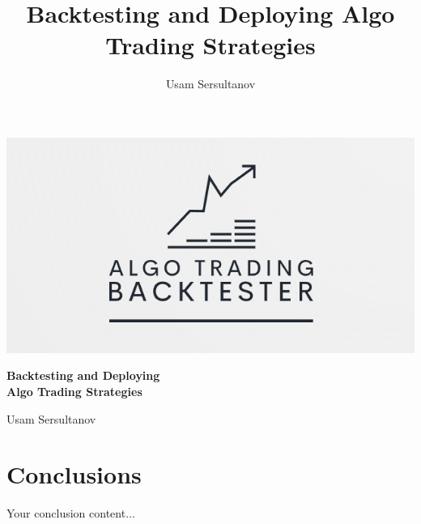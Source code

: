\documentclass[12pt, a4paper]{report} %
\title{Backtesting and Deploying Algo Trading Strategies}
\author{Usam Sersultanov}
\begin{document}
\begin{titlepage}
    \centering

	\vspace*{-2cm} %
    \includegraphics[scale=1, width=\textwidth, keepaspectratio]{./imgs/logo8.png}
	\vspace*{1cm}

    {\Huge \bfseries Backtesting and Deploying \\
    Algo Trading Strategies\par}
    \vspace{1cm}
	
    {\Large Usam Sersultanov\par}
    \vspace{5cm}

\end{titlepage}

\tableofcontents
\newpage


%
%

\chapter{Conclusions}
    Your conclusion content...
    
 


\end{document}
